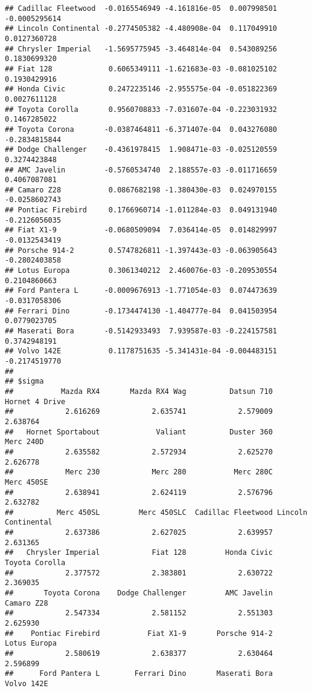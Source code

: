 \documentclass[]{article}
\begin{document}
\begin{verbatim}
## Cadillac Fleetwood  -0.0165546949 -4.161816e-05  0.007998501 -0.0005295614
## Lincoln Continental -0.2774505382 -4.480908e-04  0.117049910  0.0127360728
## Chrysler Imperial   -1.5695775945 -3.464814e-04  0.543089256  0.1830699320
## Fiat 128             0.6065349111 -1.621683e-03 -0.081025102  0.1930429916
## Honda Civic          0.2472235146 -2.955575e-04 -0.051822369  0.0027611128
## Toyota Corolla       0.9560708833 -7.031607e-04 -0.223031932  0.1467285022
## Toyota Corona       -0.0387464811 -6.371407e-04  0.043276080 -0.2834815844
## Dodge Challenger    -0.4361978415  1.908471e-03 -0.025120559  0.3274423848
## AMC Javelin         -0.5760534740  2.188557e-03 -0.011716659  0.4067087081
## Camaro Z28           0.0867682198 -1.380430e-03  0.024970155 -0.0258602743
## Pontiac Firebird     0.1766960714 -1.011284e-03  0.049131940 -0.2126056035
## Fiat X1-9           -0.0680509094  7.036414e-05  0.014829997 -0.0132543419
## Porsche 914-2        0.5747826811 -1.397443e-03 -0.063905643 -0.2802403858
## Lotus Europa         0.3061340212  2.460076e-03 -0.209530554  0.2104860663
## Ford Pantera L      -0.0009676913 -1.771054e-03  0.074473639 -0.0317058306
## Ferrari Dino        -0.1734474130 -1.404777e-04  0.041503954  0.0779023705
## Maserati Bora       -0.5142933493  7.939587e-03 -0.224157581  0.3742948191
## Volvo 142E           0.1178751635 -5.341431e-04 -0.004483151 -0.2174519770
## 
## $sigma
##           Mazda RX4       Mazda RX4 Wag          Datsun 710      Hornet 4 Drive 
##            2.616269            2.635741            2.579009            2.638764 
##   Hornet Sportabout             Valiant          Duster 360           Merc 240D 
##            2.635582            2.572934            2.625270            2.626778 
##            Merc 230            Merc 280           Merc 280C          Merc 450SE 
##            2.638941            2.624119            2.576796            2.632782 
##          Merc 450SL         Merc 450SLC  Cadillac Fleetwood Lincoln Continental 
##            2.637386            2.627025            2.639957            2.631365 
##   Chrysler Imperial            Fiat 128         Honda Civic      Toyota Corolla 
##            2.377572            2.383801            2.630722            2.369035 
##       Toyota Corona    Dodge Challenger         AMC Javelin          Camaro Z28 
##            2.547334            2.581152            2.551303            2.625930 
##    Pontiac Firebird           Fiat X1-9       Porsche 914-2        Lotus Europa 
##            2.580619            2.638377            2.630464            2.596899 
##      Ford Pantera L        Ferrari Dino       Maserati Bora          Volvo 142E 

\end{verbatim}
\end{document}
